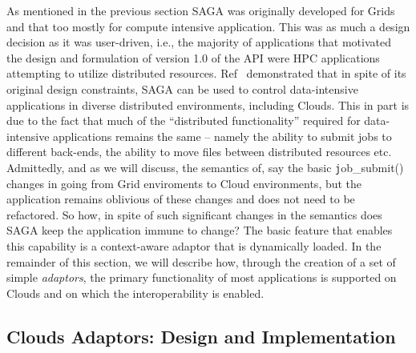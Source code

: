 \documentclass[conference,final]{IEEEtran}
\begin{document}
As mentioned in the previous section SAGA was originally developed for
Grids and that too mostly for compute intensive application. This was
as much a design decision as it was user-driven, i.e., the majority of
applications that motivated the design and formulation of version 1.0
of the API were HPC applications attempting to utilize distributed
resources.  Ref~\cite{saga_ccgrid09} demonstrated that in spite of its
original design constraints, SAGA can be used to control
data-intensive applications in diverse distributed environments,
including Clouds.  This in part is due to the fact that much of the
``distributed functionality'' required for data-intensive applications
remains the same -- namely the ability to submit jobs to different
back-ends, the ability to move files between distributed resources
etc. Admittedly, and as we will discuss, the semantics of, say the
basic {\texttt job\_submit()} changes in going from Grid enviroments
to Cloud environments, but the application remains oblivious of these
changes and does not need to be refactored. %
So how, in spite of such significant changes in the semantics does
SAGA keep the application immune to change? The basic feature that
enables this capability is a context-aware adaptor that is dynamically
loaded.  In the remainder of this section, we will describe how,
through the creation of a set of simple {\it adaptors}, the primary
functionality of most applications is supported on Clouds and on which
the interoperability is enabled.


\subsection{Clouds Adaptors: Design and Implementation}

\end{document}

